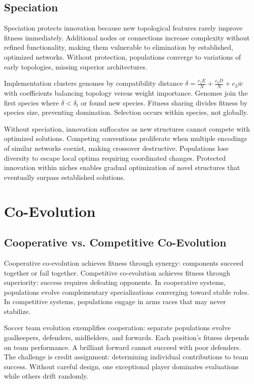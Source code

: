 \documentclass[journal,12pt,onecolumn]{IEEEtran}
\begin{document}
\subsection{Speciation}

Speciation protects innovation because new topological features rarely improve fitness immediately. Additional nodes or connections increase complexity without refined functionality, making them vulnerable to elimination by established, optimized networks. Without protection, populations converge to variations of early topologies, missing superior architectures.

Implementation clusters genomes by compatibility distance $\delta = \frac{c_1 E}{N} + \frac{c_2 D}{N} + c_3 \bar{w}$ with coefficients balancing topology versus weight importance. Genomes join the first species where $\delta < \delta_t$ or found new species. Fitness sharing divides fitness by species size, preventing domination. Selection occurs within species, not globally.

Without speciation, innovation suffocates as new structures cannot compete with optimized solutions. Competing conventions proliferate when multiple encodings of similar networks coexist, making crossover destructive. Populations lose diversity to escape local optima requiring coordinated changes. Protected innovation within niches enables gradual optimization of novel structures that eventually surpass established solutions.

\section{Co-Evolution}

\subsection{Cooperative vs. Competitive Co-Evolution}

Cooperative co-evolution achieves fitness through synergy: components succeed together or fail together. Competitive co-evolution achieves fitness through superiority: success requires defeating opponents. In cooperative systems, populations evolve complementary specializations converging toward stable roles. In competitive systems, populations engage in arms races that may never stabilize.

Soccer team evolution exemplifies cooperation: separate populations evolve goalkeepers, defenders, midfielders, and forwards. Each position's fitness depends on team performance. A brilliant forward cannot succeed with poor defenders. The challenge is credit assignment: determining individual contributions to team success. Without careful design, one exceptional player dominates evaluations while others drift randomly.
\end{document}
